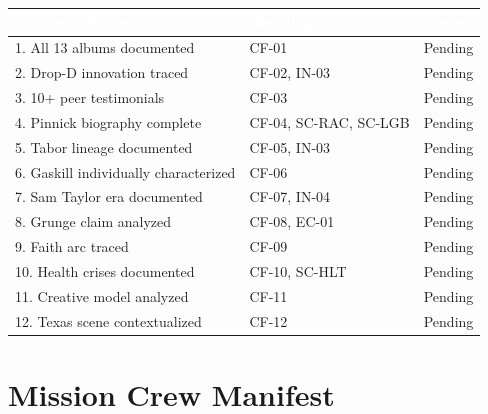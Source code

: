 \documentclass[11pt,letterpaper]{article}
\newcommand{\tableheader}[1]{\textbf{\sffamily\textcolor{white}{#1}}}
\begin{document}
\begin{center}
\begin{tabularx}{\textwidth}{XL{3.5cm}C{1.5cm}}
\toprule
{}
\tableheader{Success Criterion} & \tableheader{Test ID(s)} & \tableheader{Status} \\
. All 13 albums documented & CF-01 & Pending \\
2. Drop-D innovation traced & CF-02, IN-03 & Pending \\
3. 10+ peer testimonials & CF-03 & Pending \\
4. Pinnick biography complete & CF-04, SC-RAC, SC-LGB & Pending \\
5. Tabor lineage documented & CF-05, IN-03 & Pending \\
6. Gaskill individually characterized & CF-06 & Pending \\
7. Sam Taylor era documented & CF-07, IN-04 & Pending \\
8. Grunge claim analyzed & CF-08, EC-01 & Pending \\
9. Faith arc traced & CF-09 & Pending \\
10. Health crises documented & CF-10, SC-HLT & Pending \\
11. Creative model analyzed & CF-11 & Pending \\
12. Texas scene contextualized & CF-12 & Pending \\
\bottomrule
\end{tabularx}
\end{center}

\section{Mission Crew Manifest}
\end{document}
